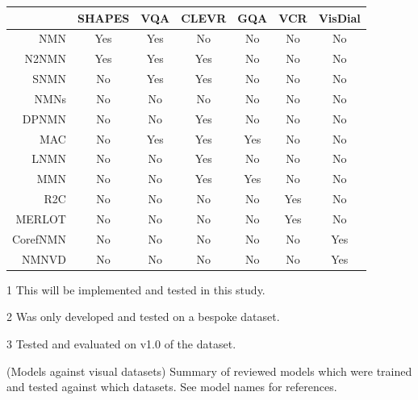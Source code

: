 \begin{table}[]
    \centering
    \begin{threeparttable}
        \small
        \begin{tabular}{@{}rcccccc@{}}
            \toprule
                                                        & SHAPES & VQA          & CLEVR & GQA & VCR         & VisDial \\ \midrule
            NMN\cite{andreas_neural_2016}               & Yes    & Yes          & No    & No  & No          & No      \\
            N2NMN\cite{hu_learning_2017}                & Yes    & Yes          & Yes   & No  & No          & No      \\
            SNMN\cite{hu_explainable_2019}              & No     & Yes          & Yes   & No  & No\tnote{1} & No      \\
            NMNs\pm{}\cite{chen_teaching_2022}\tnote{2} & No     & No           & No    & No  & No          & No      \\
            DPNMN\cite{su_toward_2020}                  & No     & No           & Yes   & No  & No          & No      \\
            MAC\cite{hudson_compositional_2018}         & No     & Yes\tnote{3} & Yes   & Yes & No          & No      \\
            LNMN\cite{pahuja_learning_2019}             & No     & No           & Yes   & No  & No          & No      \\
            MMN\cite{chen_meta_2020}                    & No     & No           & Yes   & Yes & No          & No      \\
            R2C\cite{zellers_recognition_2019}          & No     & No           & No    & No  & Yes         & No      \\
            MERLOT\cite{zellers_merlot_2022}            & No     & No           & No    & No  & Yes         & No      \\
            CorefNMN\cite{kottur_visual_2018}           & No     & No           & No    & No  & No          & Yes     \\
            NMNVD\cite{cho_visual_2021}                 & No     & No           & No    & No  & No          & Yes     \\ \bottomrule
        \end{tabular}
        \begin{tablenotes}
            \item[1] This will be implemented and tested in this study.
            \item[2] Was only developed and tested on a bespoke dataset\cite{chen_teaching_2022}.
            \item[3] Tested and evaluated on v1.0 of the dataset\cite{hudson_compositional_2018}.
        \end{tablenotes}
    \end{threeparttable}
    \captionsource(Models against visual datasets)
    {Summary of reviewed models which were trained and tested against which datasets.\label{tab:models_against_datasets}}
    {See model names for references.}
\end{table}

